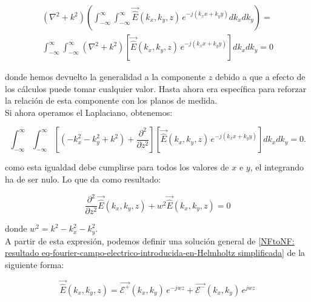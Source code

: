 \begin{multline}
\left(\nabla^{2}+k^{2}\right)\left(\int_{-\infty}^{\infty}\int_{-\infty}^{\infty}\vec{\hat{E}}(k_{x},k_{y},z)
\,e^{-j (k_{x} x+k_{y} y)} dk_{x}
dk_{y}\right)=\\
\int_{-\infty}^{\infty}\int_{-\infty}^{\infty}\left(\nabla^{2}+k^{2}\right)\left[\vec{\hat{E}}(k_{x},k_{y},z)
\,e^{-j (k_{x} x+k_{y} y)}\right] dk_{x} dk_{y}=0
\label{NFtoNF: eq-fourier-campo-electrico-introducida-en-Helmholtz}
\end{multline}

\noindent
donde hemos devuelto la generalidad a la componente $z$ debido a que a efecto de los cálculos puede tomar cualquier valor. Hasta ahora era específica para reforzar la relación de esta componente con los planos de medida.
\\

Si ahora operamos el Laplaciano, obtenemos:

\begin{equation}
\int_{-\infty}^{\infty}\int_{-\infty}^{\infty}\left[\left(-k_{x}^{2}-k_{y}^{2}+k^{2}\right)+\frac{\partial^{2}}{\partial
z^{2}}\right]\left[\vec{\hat{E}}(k_{x},k_{y},z) \,e^{-j (k_{x}
x+k_{y} y)}\right] dk_{x} dk_{y}=0.
\label{NFtoNF: eq-fourier-campo-electrico-introducida-en-Helmholtz-con-laplaciano-operado}
\end{equation}

\noindent
como esta igualdad debe cumplirse para todos los valores de $x$ e $y$, el integrando ha de ser nulo. Lo que da como resultado:

\begin{equation}
\frac{\partial^{2}}{\partial
z^{2}}\vec{\hat{E}}(k_{x},k_{y},z)+w^{2}\vec{\hat{E}}(k_{x},k_{y},z)=0
\label{NFtoNF: resultado eq-fourier-campo-electrico-introducida-en-Helmholtz simplificada}
\end{equation}

\noindent
donde $w^{2}=k^{2}-k_{x}^{2}-k_{y}^{2}$.\\

A partir de esta expresión, podemos definir una solución general de \eqref{NFtoNF: resultado eq-fourier-campo-electrico-introducida-en-Helmholtz simplificada} de la siguiente forma:

\begin{equation}
\vec{\hat{E}}(k_{x},k_{y},z)=\vec{\mathcal{E}^{+}}(k_{x},k_{y})\,e^{-j
w z}+\vec{\mathcal{E}^{-}}(k_{x},k_{y})\,e^{j w z}
\label{NFtoNF: solucion eq-fourier-campo-electrico-en-Helmholtz-general}
\end{equation}

